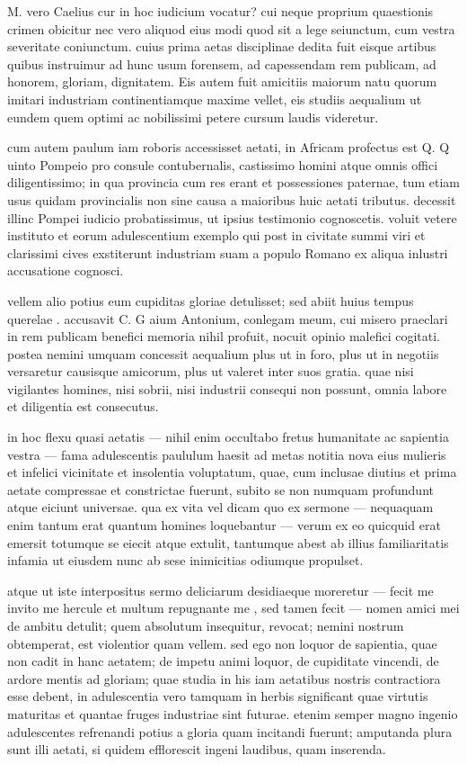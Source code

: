  M. vero Caelius cur in hoc iudicium vocatur? cui neque proprium quaestionis crimen obicitur nec vero aliquod eius modi quod sit a lege seiunctum, cum vestra severitate coniunctum. cuius prima aetas disciplinae dedita fuit eisque artibus quibus instruimur ad hunc usum forensem, ad capessendam rem publicam, ad honorem, gloriam, dignitatem. Eis autem fuit amicitiis maiorum natu quorum imitari industriam continentiamque maxime vellet, eis studiis aequalium ut eundem quem optimi ac nobilissimi petere cursum laudis videretur.

 cum autem paulum iam roboris accessisset aetati, in Africam profectus est Q. Q uinto Pompeio pro consule contubernalis, castissimo homini atque omnis offici diligentissimo; in qua provincia cum res erant et possessiones paternae, tum etiam usus quidam provincialis non sine causa a maioribus huic aetati tributus. decessit illinc Pompei iudicio probatissimus, ut ipsius testimonio cognoscetis. voluit vetere instituto et eorum adulescentium exemplo qui post in civitate summi viri et clarissimi cives exstiterunt industriam suam a populo Romano ex aliqua inlustri accusatione cognosci.

 vellem alio potius eum cupiditas gloriae detulisset; sed abiit huius tempus querelae . accusavit C. G aium Antonium, conlegam meum, cui misero praeclari in rem publicam benefici memoria nihil profuit, nocuit opinio malefici cogitati. postea nemini umquam concessit aequalium plus ut in foro, plus ut in negotiis versaretur causisque amicorum, plus ut valeret inter suos gratia. quae nisi vigilantes homines, nisi sobrii, nisi industrii consequi non possunt, omnia labore et diligentia est consecutus.

 in hoc flexu quasi aetatis — nihil enim occultabo fretus humanitate ac sapientia vestra — fama adulescentis paululum haesit ad metas notitia nova eius mulieris et infelici vicinitate et insolentia voluptatum, quae, cum inclusae diutius et prima aetate compressae et constrictae fuerunt, subito se non numquam profundunt atque eiciunt universae. qua ex vita vel dicam quo ex sermone — nequaquam enim tantum erat quantum homines loquebantur — verum ex eo quicquid erat emersit totumque se eiecit atque extulit, tantumque abest ab illius familiaritatis infamia ut eiusdem nunc ab sese inimicitias odiumque propulset.

 atque ut iste interpositus sermo deliciarum desidiaeque moreretur — fecit me invito me hercule et multum repugnante me , sed tamen fecit — nomen amici mei de ambitu detulit; quem absolutum insequitur, revocat; nemini nostrum obtemperat, est violentior quam vellem. sed ego non loquor de sapientia, quae non cadit in hanc aetatem; de impetu animi loquor, de cupiditate vincendi, de ardore mentis ad gloriam; quae studia in his iam aetatibus nostris contractiora esse debent, in adulescentia vero tamquam in herbis significant quae virtutis maturitas et quantae fruges industriae sint futurae. etenim semper magno ingenio adulescentes refrenandi potius a gloria quam incitandi fuerunt; amputanda plura sunt illi aetati, si quidem efflorescit ingeni laudibus, quam inserenda.

